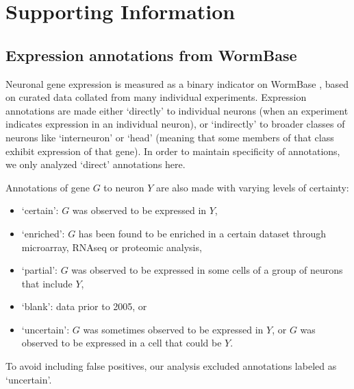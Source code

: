 \documentclass[10pt,letterpaper]{article}
\begin{document}
{%




\newpage
\section*{Supporting Information}
\setcounter{figure}{0} \renewcommand{\thefigure}{S\arabic{figure}}
\renewcommand{\thefigure}{S\arabic{figure}}
\renewcommand{\thetable}{S\arabic{table}}

\subsection*{Expression annotations from WormBase}

Neuronal gene expression is measured as a binary indicator on WormBase \cite{Harris:2009kd}, based on curated data collated from many individual experiments.
Expression annotations are made either `directly' to individual neurons (when an experiment indicates expression in an individual neuron), or `indirectly' to broader classes of neurons like `interneuron' or `head' (meaning that some members of that class exhibit expression of that gene).
In order to maintain specificity of annotations, we only analyzed `direct' annotations here.

Annotations of gene $G$ to neuron $Y$ are also made with varying levels of certainty:
\begin{itemize}
    \item `certain': $G$ was observed to be expressed in $Y$,
    \item `enriched': $G$ has been found to be enriched in a certain dataset through microarray, RNAseq or proteomic analysis,
    \item `partial': $G$ was observed to be expressed in some cells of a group of neurons that include $Y$,
    \item `blank': data prior to 2005, or
    \item `uncertain': $G$ was sometimes observed to be expressed in $Y$, or $G$ was observed to be expressed in a cell that could be $Y$.
\end{itemize}
To avoid including false positives, our analysis excluded annotations labeled as `uncertain'.


}
\end{document}
